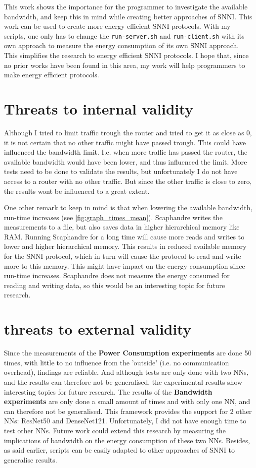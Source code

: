 \documentclass[../thesis.tex]{subfiles}
\begin{document}
This work shows the importance for the programmer to investigate the available bandwidth, and keep this in mind while creating better approaches of SNNI. This work can be used to create more energy efficient SNNI protocols. With my scripts, one only has to change the \verb|run-server.sh| and \verb|run-client.sh| with its own approach to measure the energy consumption of its own SNNI approach. This simplifies the research to energy efficient SNNI protocols. I hope that, since no prior works have been found in this area, my work will help programmers to make energy efficient protocols.

\section{Threats to internal validity}
Although I tried to limit traffic trough the router and tried to get it as close as 0, it is not certain that no other traffic might have passed trough. This could have influenced the bandwidth limit. I.e. when more traffic has passed the router, the available bandwidth would have been lower, and thus influenced the limit. More tests need to be done to validate the results, but unfortunately I do not have access to a router with no other traffic. But since the other traffic is close to zero, the results wont be influenced to a great extent.

One other remark to keep in mind is that when lowering the available bandwidth, run-time increases (see \autoref{fig:graph_times_mean}). Scaphandre writes the measurements to a file, but also saves data in higher hierarchical memory like RAM. Running Scaphandre for a long time will cause more reads and writes to lower and higher hierarchical memory. This results in reduced available memory for the SNNI protocol, which in turn will cause the protocol to read and write more to this memory. This might have impact on the energy consumption since run-time increases. Scaphandre does not measure the energy consumed for reading and writing data, so this would be an interesting topic for future research. 

\section{threats to external validity}
Since the measurements of the \textbf{Power Consumption experiments} are done 50 times, with little to no influence from the 'outside' (i.e. no communication overhead), findings are reliable. And although tests are only done with two NNs, and the results can therefore not be generalised, the experimental results show interesting topics for future research. The results of the \textbf{Bandwidth experiments} are only done a small amount of times and with only one NN, and can therefore not be generalised. This framework provides the support for 2 other NNs: ResNet50 and DenseNet121. Unfortunately, I did not have enough time to test other NNs. Future work could extend this research by measuring the implications of bandwidth on the energy consumption of these two NNs. Besides, as said earlier, scripts can be easily adapted to other approaches of SNNI to generalise results. 
\end{document}
